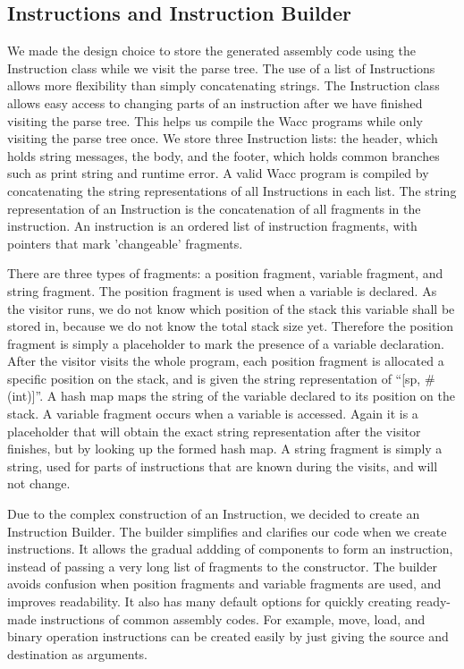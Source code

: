\documentclass[11pt]{article}
\begin{document}
\subsection{Instructions and Instruction Builder}

We made the design choice to store the generated assembly code using the Instruction class while we visit the parse tree. The use of a list of Instructions allows more flexibility than simply concatenating strings. The Instruction class allows easy access to changing parts of an instruction after we have finished visiting the parse tree. This helps us compile the Wacc programs while only visiting the parse tree once. We store three Instruction lists: the header, which holds string messages, the body, and the footer, which holds common branches such as print string and runtime error. A valid Wacc program is compiled by concatenating the string representations of all Instructions in each list. The string representation of an Instruction is the concatenation of all fragments in the instruction. An instruction is an ordered list of instruction fragments, with pointers that mark 'changeable' fragments. 

\medskip

There are three types of fragments: a position fragment, variable fragment, and string fragment. The position fragment is used when a variable is declared. As the visitor runs, we do not know which position of the stack this variable shall be stored in, because we do not know the total stack size yet. Therefore the position fragment is simply a placeholder to mark the presence of a variable declaration. After the visitor visits the whole program, each position fragment is allocated a specific position on the stack, and is given the string representation of ``[sp, \#(int)]''. A hash map maps the string of the variable declared to its position on the stack. A variable fragment occurs when a variable is accessed. Again it is a placeholder that will obtain the exact string representation after the visitor finishes, but by looking up the formed hash map. A string fragment is simply a string, used for parts of instructions that are known during the visits, and will not change.

\medskip

Due to the complex construction of an Instruction, we decided to create an Instruction Builder. The builder simplifies and clarifies our code when we create instructions. It allows the gradual addding of components to form an instruction, instead of passing a very long list of fragments to the constructor. The builder avoids confusion when position fragments and variable fragments are used, and improves readability. It also has many default options for quickly creating ready-made instructions of common assembly codes. For example, move, load, and binary operation instructions can be created easily by just giving the source and destination as arguments.
\end{document}
